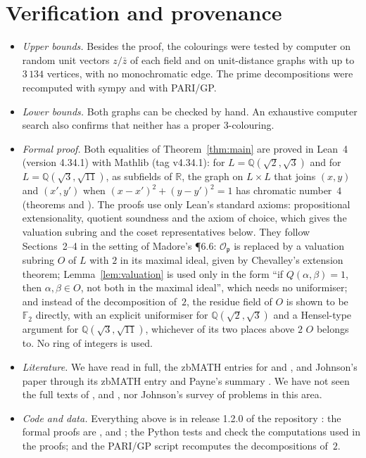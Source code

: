 \documentclass[11pt,a4paper]{amsart}
\theoremstyle{remark}
\newcommand{\F}{\mathbb{F}}
\newcommand{\Q}{\mathbb{Q}}
\newcommand{\R}{\mathbb{R}}
\newcommand{\Op}{\mathcal{O}_{\mathfrak{p}}}
\begin{document}
\section{Verification and provenance}\label{sec:verification}

\begin{itemize}
\item \emph{Upper bounds.} Besides the proof, the colourings were tested by computer on random unit vectors
$z/\bar z$ of each field and on unit-distance graphs with up to $3\,134$ vertices, with no monochromatic edge.
The prime decompositions were recomputed with sympy and with PARI/GP.
\item \emph{Lower bounds.} Both graphs can be checked by hand. An exhaustive computer search also confirms that
neither has a proper $3$-colouring.
\item \emph{Formal proof.} Both equalities of Theorem~\ref{thm:main} are proved in Lean~4 \cite{Lean4}
(version 4.34.1) with Mathlib \cite{Mathlib} (tag v4.34.1): for $L=\Q(\sqrt2,\sqrt3)$ and for
$L=\Q(\sqrt3,\sqrt{11})$, as subfields of $\R$, the graph on $L\times L$ that joins $(x,y)$ and $(x',y')$ when
$(x-x')^2+(y-y')^2=1$ has chromatic number~$4$ (theorems  and
). The proofs use only Lean's standard axioms: propositional
extensionality, quotient soundness and the axiom of choice, which gives the valuation subring and the coset
representatives below. They follow Sections~2--4 in the setting of Madore's \P6.6: $\Op$ is replaced by a
valuation subring $O$ of $L$ with $2$ in its maximal ideal, given by Chevalley's extension theorem;
Lemma~\ref{lem:valuation} is used only in the form ``if $Q(\alpha,\beta)=1$, then $\alpha,\beta\in O$, not both
in the maximal ideal'', which needs no uniformiser; and instead of the decomposition of~$2$, the residue field
of $O$ is shown to be $\F_2$ directly, with an explicit uniformiser for $\Q(\sqrt2,\sqrt3)$ and a Hensel-type
argument for $\Q(\sqrt3,\sqrt{11})$, whichever of its two places above $2$ $O$ belongs to. No ring of integers
is used.
\item \emph{Literature.} We have read \cite{Fischer1990} in full, the zbMATH entries for \cite{Fischer1990b} and
\cite{Fischer1994}, and Johnson's paper \cite{Johnson1987} through its zbMATH entry and Payne's summary
\cite{Payne}. We have not seen the full texts of \cite{Fischer1990b}, \cite{Fischer1994} and
\cite{Johnson1987}, nor Johnson's survey \cite{Johnson2000} of problems in this area.
\item \emph{Code and data.} Everything above is in release 1.2.0 of the repository \cite{Repo}: the formal proofs are ,
 and ; the Python tests  and
 check the computations used in the proofs; and the PARI/GP script
 recomputes the decompositions of~$2$.
\end{itemize}
\end{document}
